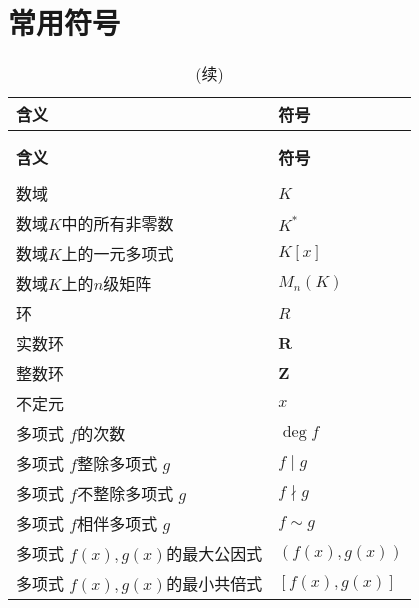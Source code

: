 \section{常用符号}
\begin{longtable}{p{2in}|l}
    \caption{符号表}\\
    \hline\hline
    \sffamily\bfseries{含义}&\sffamily\bfseries{符号}\\
    \hline
    \endfirsthead
    \caption{(续)}\\
    \hline\\
    \sffamily\bfseries{含义}&\sffamily\bfseries{符号}\\
    \hline\\
    \endhead
    \hline\hline
    \endfoot
    数域&$K$\\
    数域$K$中的所有非零数&$K^*$\\
    数域$K$上的一元多项式&$K[x]$\\
    数域$K$上的$n$级矩阵&$M_n(K)$\\
    环& $R$\\
    实数环&$\mathbf{R}$\\
    整数环&$\mathbf{Z}$\\
    不定元&$x$\\
    多项式 $f$的次数& $\deg f$\\
    多项式 $f$整除多项式 $g$& $f\mid g$\\
    多项式 $f$不整除多项式 $g$& $f\nmid g$\\
    多项式 $f$相伴多项式 $g$& $f\sim g$\\
    多项式 $f(x),g(x)$的最大公因式& $(f(x),g(x))$\\
    多项式 $f(x),g(x)$的最小共倍式& $[f(x),g(x)]$\\
\end{longtable}
